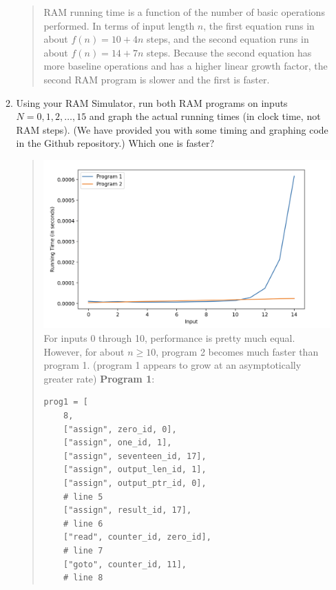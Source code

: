 \documentclass[11pt]{article}
\begin{document}
\begin{enumerate}
\begin{enumerate}
\begin{quote}
        \newline
        \newline
        RAM running time is a function of the number of basic operations performed. In terms of input length $n$, the first equation runs in about $f(n) = 10 + 4n$ steps, and the second equation runs in about $f(n) = 14 + 7n$ steps. Because the second equation has more baseline operations and has a higher linear growth factor, the second RAM program is slower and the first is faster.
    \end{quote}
    \item Using your RAM Simulator, run both RAM programs on inputs $N=0,1,2,\ldots,15$ and graph the actual running times (in clock time, not RAM steps).  (We have provided you with some timing and graphing code in the Github repository.) Which one is faster?  \label{itm:realtime}  
    \begin{quote}
        \color{purple}
        \includegraphics[scale=0.4]{work/2b.png}         
        \newline
        For inputs 0 through 10, performance is pretty much equal. However, for about $n \geq 10$, program 2 becomes much faster than program 1. (program 1 appears to grow at an asymptotically greater rate)
    \newline 
    \newline 
    \textbf{Program 1}: \newline 
    \begin{verbatim}
prog1 = [
    8,
    ["assign", zero_id, 0],
    ["assign", one_id, 1],
    ["assign", seventeen_id, 17],
    ["assign", output_len_id, 1],
    ["assign", output_ptr_id, 0],
    # line 5
    ["assign", result_id, 17],
    # line 6
    ["read", counter_id, zero_id],
    # line 7
    ["goto", counter_id, 11],
    # line 8

\end{verbatim}
\end{quote}
\end{enumerate}
\end{enumerate}
\end{document}
